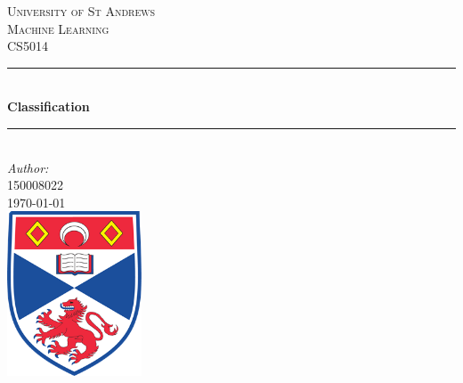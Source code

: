 \documentclass[12pt]{article}
\begin{document}
\begin{titlepage}

\newcommand{\HRule}{\rule{\linewidth}{0.5mm}} %

\center %
 

\textsc{\LARGE University of St Andrews}\\[1.5cm] %
\textsc{\Large Machine Learning}\\[0.5cm] %
\textsc{\large CS5014}\\[0.5cm] %


\HRule \\[0.4cm]
{ \huge \bfseries Classification}\\[0.4cm] %
\HRule \\[1.5cm]
 


\Large \emph{Author:}\\
 \textsc{150008022}\\[1cm] %
 

{\large \today}\\[2cm] %


\includegraphics[width = 4cm]{images/standrewslogo.png}
 

\end{titlepage}
\end{document}
